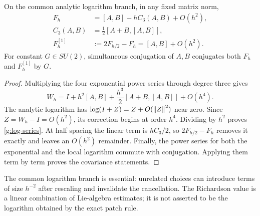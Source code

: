 
\begin{proposition}\label{g:curvature-order}
On the common analytic logarithm branch, in any fixed matrix norm,
\begin{align}
 F_h&=[A,B]+hC_3(A,B)+O(h^2),\label{g:log-series}\\
 C_3(A,B)&=\tfrac12[A+B,[A,B]],\label{g:cubic-coefficient}\\
 F_h^{[1]}&:=2F_{h/2}-F_h=[A,B]+O(h^2).
 \label{g:richardson-formula}
\end{align}
For constant $G\in SU(2)$, simultaneous conjugation of $A,B$ conjugates both $F_h$ and $F_h^{[1]}$ by $G$.
\end{proposition}

\begin{proof}
Multiplying the four exponential power series through degree three gives
\[
 W_h=I+h^2[A,B]+\frac{h^3}{2}[A+B,[A,B]]+O(h^4).
\]
The analytic logarithm has $\log(I+Z)=Z+O(\left\lVert Z\right\rVert^2)$ near zero. Since $Z=W_h-I=O(h^2)$, its correction begins at order $h^4$. Dividing by $h^2$ proves \eqref{g:log-series}. At half spacing the linear term is $hC_3/2$, so $2F_{h/2}-F_h$ removes it exactly and leaves an $O(h^2)$ remainder. Finally, the power series for both the exponential and the local logarithm commute with conjugation. Applying them term by term proves the covariance statements.
\end{proof}

The common logarithm branch is essential: unrelated choices can introduce terms of size $h^{-2}$ after rescaling and invalidate the cancellation. The Richardson value is a linear combination of Lie-algebra estimates; it is not asserted to be the logarithm obtained by the exact patch rule.


